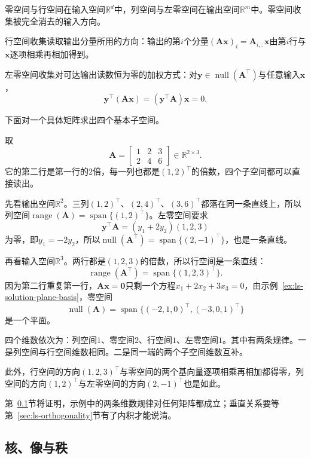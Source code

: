 零空间与行空间在输入空间$\mathbb R^d$中，列空间与左零空间在输出空间$\mathbb R^m$中。零空间收集被完全消去的输入方向。

行空间收集读取输出分量所用的方向：输出的第$i$个分量$(\bm A\bm x)_i=\bm A_{i,:}\bm x$由第$i$行与$\bm x$逐项相乘再相加得到。

左零空间收集对可达输出读数恒为零的加权方式：对$\bm y\in\operatorname{null}(\bm A^\top)$与任意输入$\bm x$，
\[
 \bm y^\top(\bm A\bm x)=(\bm y^\top\bm A)\bm x=0 .
\]

下面对一个具体矩阵求出四个基本子空间。
\begin{example}
\label{ex:ls-rank-one-four-subspaces}
取
\[
 \bm A=\begin{bmatrix}1&2&3\\2&4&6\end{bmatrix}\in\mathbb R^{2\times3}.
\]
它的第二行是第一行的$2$倍，每一列也都是$(1,2)^\top$的倍数，四个子空间都可以直接读出。

先看输出空间$\mathbb R^2$。三列$(1,2)^\top$、$(2,4)^\top$、$(3,6)^\top$都落在同一条直线上，所以列空间$\operatorname{range}(\bm A)=\operatorname{span}\{(1,2)^\top\}$。左零空间要求
\[
 \bm y^\top\bm A=(y_1+2y_2)(1,2,3)
\]
为零，即$y_1=-2y_2$，所以$\operatorname{null}(\bm A^\top)=\operatorname{span}\{(2,-1)^\top\}$，也是一条直线。

再看输入空间$\mathbb R^3$。两行都是$(1,2,3)$的倍数，所以行空间是一条直线：
\[
 \operatorname{range}(\bm A^\top)=\operatorname{span}\{(1,2,3)^\top\}.
\]
因为第二行重复第一行，$\bm A\bm x=\bm0$只剩一个方程$x_1+2x_2+3x_3=0$，由示例~\ref{ex:ls-solution-plane-basis}，零空间
\[
 \operatorname{null}(\bm A)=\operatorname{span}\{(-2,1,0)^\top,(-3,0,1)^\top\}
\]
是一个平面。

四个维数依次为：列空间$1$、零空间$2$、行空间$1$、左零空间$1$。其中有两条规律。一是列空间与行空间维数相同。二是同一端的两个子空间维数互补。

此外，行空间的方向$(1,2,3)^\top$与零空间的两个基向量逐项相乘再相加都得零，列空间的方向$(1,2)^\top$与左零空间的方向$(2,-1)^\top$也是如此。
\end{example}
第~\ref{sec:ls-kernel-image}节将证明，示例中的两条维数规律对任何矩阵都成立；垂直关系要等第~\ref{sec:ls-orthogonality}节有了内积才能说清。

\subsection{核、像与秩}
\label{sec:ls-kernel-image}


